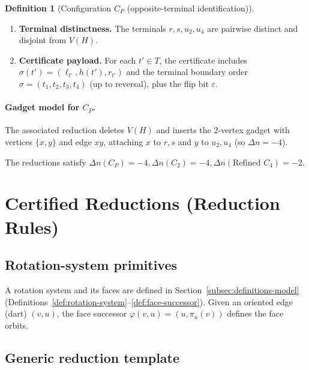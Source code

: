\documentclass[12pt]{article}
\theoremstyle{definition}
\newtheorem{definition}[theorem]{Definition}
\newcommand{\PinchGadgetVertices}{2}
\newcommand{\CtwoDelta}{-4}
\newcommand{\RefinedCfourDelta}{-2}
\newcommand{\PinchIIGadgetDelta}{-4}
\begin{document}
\begin{definition}[Configuration $C_P$ (opposite-terminal identification)]
\begin{enumerate}
\smallskip
\noindent\emph{Remark.} Since $w$ and $t$ are cubic, the local rotation at each is determined up to reversal; the certificate therefore only records the resulting flip bit $\varepsilon$ together with the boundary order of the underlying facial 4-cycle.

\item \textbf{Terminal distinctness.}
The terminals $r,s,u_2,u_4$ are pairwise distinct and disjoint from $V(H)$.

\item \textbf{Certificate payload.}
For each $t'\in T$, the certificate includes $\sigma(t')=(\ell_{t'},h(t'),r_{t'})$ and the terminal boundary order $\sigma=(t_1,t_2,t_3,t_4)$ (up to reversal), plus the flip bit $\varepsilon$.
\end{enumerate}
\end{definition}

\paragraph{Gadget model for $C_P$.}
The associated reduction deletes $V(H)$ and inserts the \PinchGadgetVertices-vertex gadget with vertices $\{x,y\}$ and edge $xy$, attaching $x$ to $r,s$ and $y$ to $u_2,u_4$ (so $\Delta n = \PinchIIGadgetDelta$).

The reductions satisfy $\Delta n(C_P) = \PinchIIGadgetDelta, \Delta n(C_2) = \CtwoDelta, \Delta n(\text{Refined } C_4) = \RefinedCfourDelta$.

\section{Certified Reductions (Reduction Rules)}
\label{sec:reductions}

\subsection{Rotation-system primitives}
\label{subsec:rot-primitives}

A rotation system and its faces are defined in Section~\ref{subsec:definitions-model} (Definitions~\ref{def:rotation-system}--\ref{def:face-successor}).
Given an oriented edge (dart) $(v,u)$, the face successor $\varphi(v,u) = (u, \pi_u(v))$ defines the face orbits.

\subsection{Generic reduction template}
\label{subsec:generic-reduce}
\end{document}
